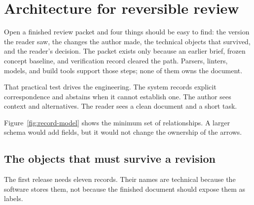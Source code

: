 \chapter{Architecture for reversible review}
\label{ch:architecture}

Open a finished review packet and four things should be easy to find: the
version the reader saw, the changes the author made, the technical objects that
survived, and the reader's decision. The packet exists only because an earlier
brief, frozen concept baseline, and verification record cleared the path.
Parsers, linters, models, and build tools support those steps; none of them owns
the document.

That practical test drives the engineering. The system records explicit
correspondence and abstains when it cannot establish one. The author sees
context and alternatives. The reader sees a clean document and a short task.

Figure~\ref{fig:record-model} shows the minimum set of relationships. A larger
schema would add fields, but it would not change the ownership of the arrows.

\hvFigureRecordModel

\section{The objects that must survive a revision}
\label{sec:architecture-objects}

The first release needs eleven records. Their names are technical
because the software stores them, not because the finished document should
expose them as labels.

